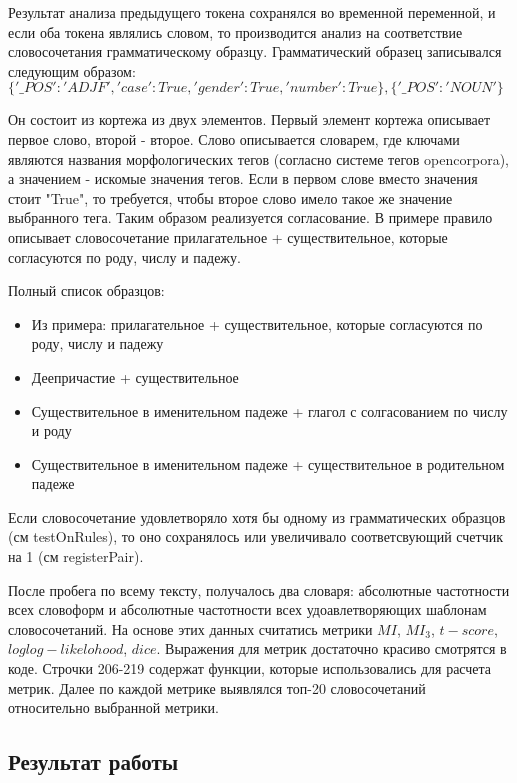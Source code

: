 \documentclass{article}
\begin{document}
    Результат анализа предыдущего токена сохранялся во временной переменной, и если оба токена являлись словом, то производится анализ на соответствие словосочетания грамматическому образцу. Грамматический образец записывался следующим образом:\\
    \(\{'\_POS':'ADJF', 'case': True, 'gender': True, 'number': True\}, \{'\_POS':'NOUN'\}\)

    Он состоит из кортежа из двух элементов. Первый элемент кортежа описывает первое слово, второй - второе. Слово описывается словарем, где ключами являются названия морфологических тегов (согласно системе тегов opencorpora), а значением - искомые значения тегов. Если в первом слове вместо значения стоит "True", то требуется, чтобы второе слово имело такое же значение выбранного тега. Таким образом реализуется согласование. В примере правило описывает словосочетание прилагательное + существительное, которые согласуются по роду, числу и падежу.

    Полный список образцов:
    \begin{itemize}
        \item Из примера: прилагательное + существительное, которые согласуются по роду, числу и падежу
        \item Деепричастие + существительное
        \item Существительное в именительном падеже + глагол с солгасованием по числу и роду
        \item Существительное в именительном падеже + существительное в родительном падеже
    \end{itemize}

    Если словосочетание удовлетворяло хотя бы одному из грамматических образцов (см testOnRules), то оно сохранялось или увеличивало соответсвующий счетчик на 1 (см registerPair).

    После пробега по всему тексту, получалось два словаря: абсолютные частотности всех словоформ и абсолютные частотности всех удоавлетворяющих шаблонам словосочетаний. На основе этих данных считатись метрики $MI$, $MI_3$, $t-score$, $loglog-likelohood$, $dice$. Выражения для метрик достаточно красиво смотрятся в коде. Строчки 206-219 содержат функции, которые использовались для расчета метрик. Далее по каждой метрике выявлялся топ-20 словосочетаний относительно выбранной метрики.

    \subsection{Результат работы}
\end{document}
